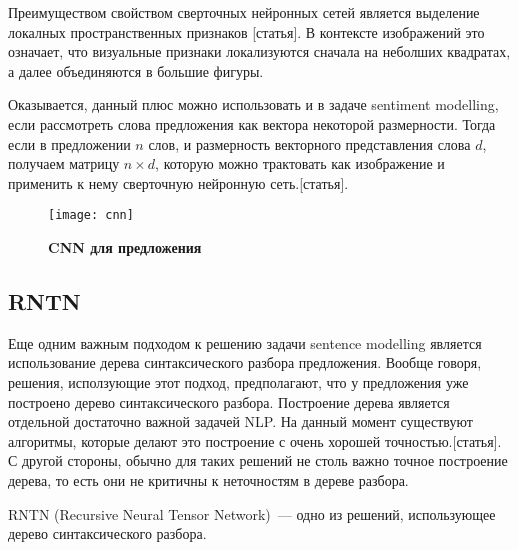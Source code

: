 Преимуществом свойством сверточных нейронных сетей является выделение локалных пространственных признаков [статья]. В контексте изображений это означает, что визуальные признаки локализуются сначала на неболших квадратах, а далее объединяются в большие фигуры.

Оказывается, данный плюс можно использовать и в задаче sentiment modelling, если рассмотреть слова предложения как вектора некоторой размерности. Тогда если в предложении $n$ слов, 
и размерность векторного представления слова $d$, получаем матрицу $n \times d$, 
которую можно трактовать как изображение и применить к нему сверточную нейронную сеть.[статья].


\begin{figure}[h]
\texttt{[image: cnn]}
\caption{\textbf{CNN для предложения}}
\label{fig:cnn}
\end{figure}


\subsection{RNTN}
Еще одним важным подходом к решению задачи sentence modelling является использование 
дерева синтаксического разбора предложения. Вообще говоря, решения, исползующие этот подход, предполагают, что у предложения уже построено дерево синтаксического разбора. Построение дерева является отдельной достаточно важной задачей NLP. На данный момент существуют алгоритмы, которые делают это построение с очень хорошей точностью.[статья]. 
С другой стороны, обычно для таких решений не столь важно точное построение дерева, то есть они не критичны к неточностям в дереве разбора.

RNTN (Recursive Neural Tensor Network)~--- одно из решений, использующее дерево синтаксического разбора.
 